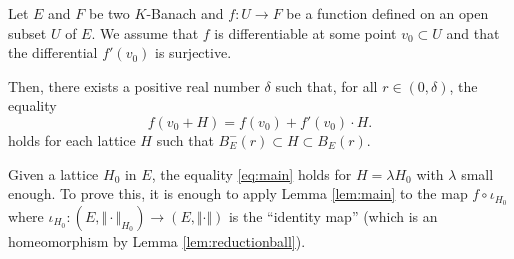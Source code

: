 \documentclass{lms}
\begin{document}
\begin{lem} \label{lem:main}
Let $E$ and $F$ be two $K$-Banach and $f : U 
\rightarrow F$ be a function defined on an open subset $U$ of $E$.
We assume that $f$ is differentiable at some point $v_0 \subset 
U$ and that the differential $f'(v_0)$ is surjective. 

Then, there exists a positive real number $\delta$ such that, for all $r 
\in (0, \delta)$, the equality
\begin{equation}
\label{eq:main}
f(v_0 + H) = f(v_0) + f'(v_0) \cdot H.
\end{equation}
holds for each lattice $H$ such that $B^-_E(r) \subset H \subset
B_E(r)$.
\end{lem}

\begin{rmk}
Given a lattice $H_0$ in $E$, the equality \eqref{eq:main} holds for $H 
= \lambda H_0$ with $\lambda$ small enough. To prove this, it is enough 
to apply Lemma \ref{lem:main} to the map $f \circ \iota_{H_0}$ where 
$\iota_{H_0} : (E, \Vert \cdot \Vert_{H_0}) \to (E, \Vert \cdot \Vert)$ 
is the ``identity map'' (which is an homeomorphism by Lemma 
\ref{lem:reductionball}).
\end{rmk}
\end{document}

